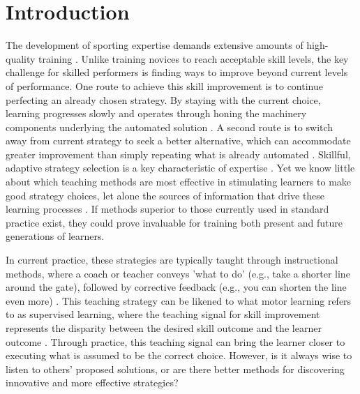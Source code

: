 \documentclass[pdflatex,sn-mathphys-num]{sn-jnl}%
\theoremstyle{thmstyleone}%
\theoremstyle{thmstyletwo}%
\theoremstyle{thmstylethree}%
\begin{document}
\section{Introduction}

The development of sporting expertise demands extensive amounts of high-quality training \cite{ericsson_role_1993, hodges_predicting_2004, vaeyens_talent_2009, sosniak_learning_1985}. Unlike training novices to reach acceptable skill levels, the key challenge for skilled performers is finding ways to improve beyond current levels of performance\cite{ericsson_development_2003, ericsson_scientific_1998, gray_plateaus_2017, williams_expertise_2008, du_relationship_2022}. One route to achieve this skill improvement is to continue perfecting an already chosen strategy. By staying with the current choice, learning progresses slowly and operates through honing the machinery components underlying the automated solution \cite{du_relationship_2022}. A second route is to switch away from current strategy to seek a better alternative, which can accommodate greater improvement than simply repeating what is already automated   \cite{gray_plateaus_2017, du_relationship_2022, krakauer_motor_2019}. Skillful, adaptive strategy selection is a key characteristic of expertise \cite{ericsson_scientific_1998, ericsson_development_2003, krakauer_motor_2019, stanley_motor_2013}. Yet we know little about which teaching methods are most effective in stimulating learners to make good strategy choices, let alone the sources of information that drive these learning processes \cite{taylor_cerebellar_2014, taylor_role_2012}. If methods superior to those currently used in standard practice exist, they could prove invaluable for training both present and future generations of learners.

In current practice, these strategies are typically taught through instructional methods, where a coach or teacher conveys 'what to do' (e.g., take a shorter line around the gate), followed by corrective feedback (e.g., you can shorten the line even more) \cite{williams_practice_2005, williams_effective_2023, hodges_role_1999}. This teaching strategy can be likened to what motor learning refers to as supervised learning, where the teaching signal for skill improvement represents the disparity between the desired skill outcome and the learner outcome \cite{jordan_forward_1992, wolpert_motor_2010, doya_complementary_2000}. Through practice, this teaching signal can bring the learner closer to executing what is assumed to be the correct choice. However, is it always wise to listen to others' proposed solutions, or are there better methods for discovering innovative and more effective strategies?
\end{document}

